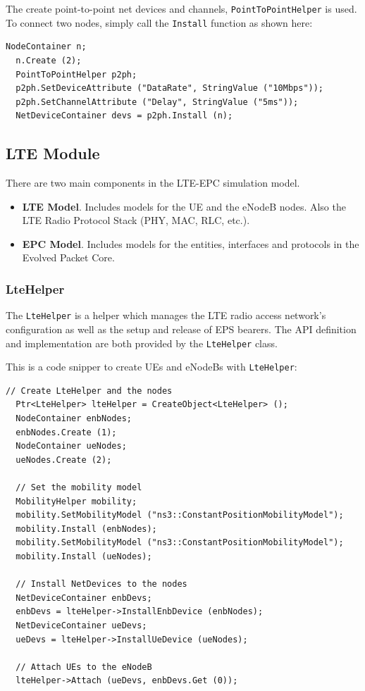 The create point-to-point net devices and channels, \texttt{PointToPointHelper} is used. To
connect two nodes, simply call the \texttt{Install} function as shown here:

\begin{lstlisting}[language=myC++, caption={PointToPointHelper}, captionpos=b]
  NodeContainer n;
  n.Create (2);
  PointToPointHelper p2ph;
  p2ph.SetDeviceAttribute ("DataRate", StringValue ("10Mbps"));
  p2ph.SetChannelAttribute ("Delay", StringValue ("5ms"));
  NetDeviceContainer devs = p2ph.Install (n);
\end{lstlisting}


\subsection{LTE Module}
There are two main components in the LTE-EPC simulation model.

\begin{itemize}[topsep=0pt, noitemsep]
  \item \textbf{LTE Model}. Includes models for the UE and the eNodeB nodes. Also the LTE Radio Protocol
  Stack (PHY, MAC, RLC, etc.).

  \item \textbf{EPC Model}. Includes models for the entities, interfaces and protocols in the Evolved Packet Core.
\end{itemize}

\subsubsection{LteHelper}
The \texttt{LteHelper} is a helper which manages the LTE radio access network's 
configuration as well as the setup and release of EPS bearers. The API definition and 
implementation are both provided by the \texttt{LteHelper} class.

This is a code snipper to create UEs and eNodeBs with \texttt{LteHelper}:

\begin{lstlisting}[language=myC++,caption={LteHelper usage}, captionpos=b]
  // Create LteHelper and the nodes
  Ptr<LteHelper> lteHelper = CreateObject<LteHelper> ();
  NodeContainer enbNodes;
  enbNodes.Create (1);
  NodeContainer ueNodes;
  ueNodes.Create (2);

  // Set the mobility model
  MobilityHelper mobility;
  mobility.SetMobilityModel ("ns3::ConstantPositionMobilityModel");
  mobility.Install (enbNodes);
  mobility.SetMobilityModel ("ns3::ConstantPositionMobilityModel");
  mobility.Install (ueNodes);

  // Install NetDevices to the nodes
  NetDeviceContainer enbDevs;
  enbDevs = lteHelper->InstallEnbDevice (enbNodes);
  NetDeviceContainer ueDevs;
  ueDevs = lteHelper->InstallUeDevice (ueNodes);  

  // Attach UEs to the eNodeB
  lteHelper->Attach (ueDevs, enbDevs.Get (0));
\end{lstlisting}

